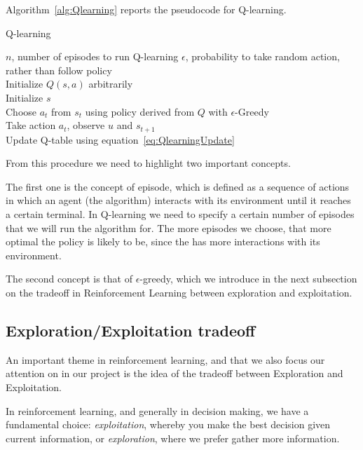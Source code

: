 Algorithm~\ref{alg:Qlearning} reports the pseudocode for Q-learning.

\begin{algorithm}
\caption{Q-learning}
\label{alg:Qlearning}
\begin{algorithmic}[1]
\Require $n$, number of episodes to run Q-learning
\Require $\epsilon$, probability to take random action, rather than follow policy
 {}
\\Initialize $Q(s,a)$ arbitrarily
\\ \qquad Initialize $s$
\\ \qquad \qquad Choose $a_t$ from $s_t$ using policy derived from $Q$ with $\epsilon$-Greedy
\\ \qquad \qquad Take action $a_t$, observe $u$ and $s_{t+1}$
\\ \qquad \qquad Update Q-table using equation~\ref{eq:QlearningUpdate}
\EndFor
\EndFor
\EndProcedure
\end{algorithmic}
\end{algorithm}

From this procedure we need to highlight two important concepts.

The first one is the concept of episode, which is defined as a sequence of actions in which an agent (the algorithm) interacts with its environment until it reaches a certain terminal. In Q-learning we need to specify a certain number of episodes that we will run the algorithm for. The more episodes we choose, that more optimal the policy is likely to be, since the has more interactions with its environment.

The second concept is that of $\epsilon$-greedy, which we introduce in the next subsection on the tradeoff in Reinforcement Learning between exploration and exploitation.

\subsection{Exploration/Exploitation tradeoff}
An important theme in reinforcement learning, and that we also focus our attention on in our project is the idea of the tradeoff between Exploration and Exploitation.

In reinforcement learning, and generally in decision making, we have a fundamental choice: \textit{exploitation}, whereby you make the best decision given current information, or \textit{exploration}, where we prefer gather more information.

